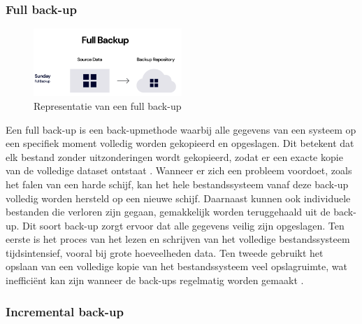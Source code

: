 \subsubsection{Full back-up}%
\begin{figure}[h] 
    \includegraphics[width=0.5\textwidth]{img/fullb.png}  
    \caption{Representatie van een full back-up \autocite{Rivas2022}}   
    \label{fig:fullback-up}           
\end{figure}
Een full back-up is een back-upmethode waarbij alle gegevens van een systeem op een specifiek moment volledig worden gekopieerd en opgeslagen. Dit betekent dat elk bestand zonder uitzonderingen wordt gekopieerd, zodat er een exacte kopie van de volledige dataset ontstaat \autocite{Beard2018}. Wanneer er zich een probleem voordoet, zoals het falen van een harde schijf, kan het hele bestandssysteem vanaf deze back-up volledig worden hersteld op een nieuwe schijf. Daarnaast kunnen ook individuele bestanden die verloren zijn gegaan, gemakkelijk worden teruggehaald uit de back-up. Dit soort back-up zorgt ervoor dat alle gegevens veilig zijn opgeslagen. Ten eerste is het proces van het lezen en schrijven van het volledige bestandssysteem tijdsintensief, vooral bij grote hoeveelheden data. Ten tweede gebruikt het opslaan van een volledige kopie van het bestandssysteem veel opslagruimte, wat inefficiënt kan zijn wanneer de back-ups regelmatig worden gemaakt \autocite{Chervenak1998}.


\subsubsection{Incremental back-up}

